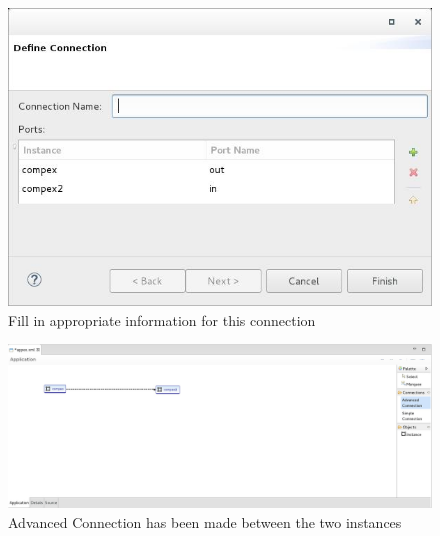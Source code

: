 \begin{flushleft}
\begin{figure}[h!]
    \centering
	\includegraphics[scale=0.45]{figures/connection-dialog.jpg}
	\caption{Fill in appropriate information for this connection}
	\label{fig:figure24}
\end{figure}

\begin{figure}[h!]
    \centering
	\includegraphics[scale=0.31]{figures/connection-complete.jpg}
	\caption{Advanced Connection has been made between the two instances}
	\label{fig:figure25}
\end{figure}

\end{flushleft}


